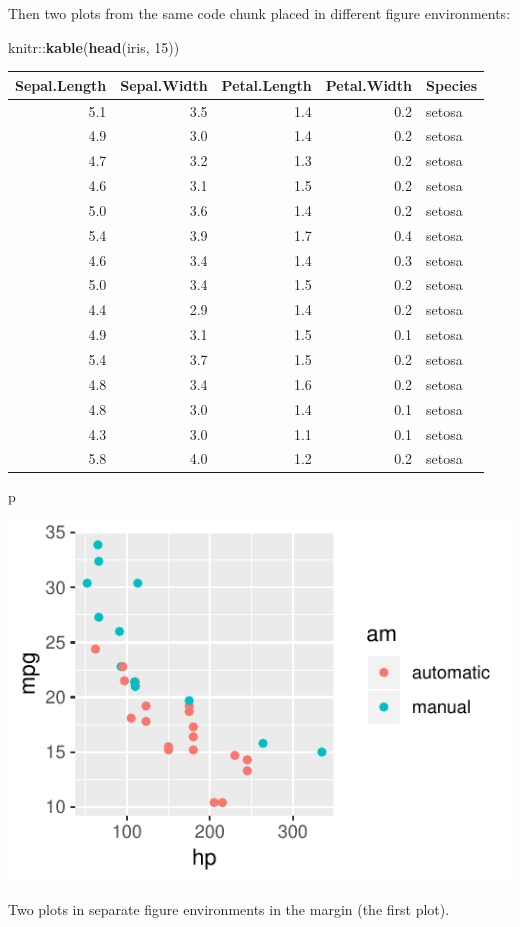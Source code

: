\documentclass[]{tufte-handout}
\newenvironment{Shaded}{}{}
\newcommand{\DecValTok}[1]{\textcolor[rgb]{0.25,0.63,0.44}{#1}}
\newcommand{\KeywordTok}[1]{\textcolor[rgb]{0.00,0.44,0.13}{\textbf{#1}}}
\newcommand{\NormalTok}[1]{#1}
\newcommand{\OperatorTok}[1]{\textcolor[rgb]{0.40,0.40,0.40}{#1}}
\begin{document}
Then two plots from the same code chunk placed in different figure
environments:

\begin{Shaded}
\begin{Highlighting}[]
\NormalTok{knitr}\OperatorTok{::}\KeywordTok{kable}\NormalTok{(}\KeywordTok{head}\NormalTok{(iris, }\DecValTok{15}\NormalTok{))}
\end{Highlighting}
\end{Shaded}

\begin{longtable}[]{@{}rrrrl@{}}
\toprule
Sepal.Length & Sepal.Width & Petal.Length & Petal.Width &
Species\tabularnewline
\midrule
\endhead
5.1 & 3.5 & 1.4 & 0.2 & setosa\tabularnewline
4.9 & 3.0 & 1.4 & 0.2 & setosa\tabularnewline
4.7 & 3.2 & 1.3 & 0.2 & setosa\tabularnewline
4.6 & 3.1 & 1.5 & 0.2 & setosa\tabularnewline
5.0 & 3.6 & 1.4 & 0.2 & setosa\tabularnewline
5.4 & 3.9 & 1.7 & 0.4 & setosa\tabularnewline
4.6 & 3.4 & 1.4 & 0.3 & setosa\tabularnewline
5.0 & 3.4 & 1.5 & 0.2 & setosa\tabularnewline
4.4 & 2.9 & 1.4 & 0.2 & setosa\tabularnewline
4.9 & 3.1 & 1.5 & 0.1 & setosa\tabularnewline
5.4 & 3.7 & 1.5 & 0.2 & setosa\tabularnewline
4.8 & 3.4 & 1.6 & 0.2 & setosa\tabularnewline
4.8 & 3.0 & 1.4 & 0.1 & setosa\tabularnewline
4.3 & 3.0 & 1.1 & 0.1 & setosa\tabularnewline
5.8 & 4.0 & 1.2 & 0.2 & setosa\tabularnewline
\bottomrule
\end{longtable}

\begin{Shaded}
\begin{Highlighting}[]
\NormalTok{p}
\end{Highlighting}
\end{Shaded}

\begin{marginfigure}
\includegraphics{Epi_Notes_files/figure-latex/fig-margin-separate-1} \caption[Two plots in separate figure environments in the margin (the first plot)]{Two plots in separate figure environments in the margin (the first plot).}\label{fig:fig-margin-separate1}
\end{marginfigure}
\end{document}
